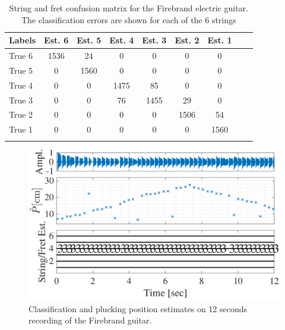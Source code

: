 \documentclass{article}
\begin{document}
%
\begin{table}\centering \vspace{-.6mm}
\caption{String and fret confusion matrix for the Firebrand electric guitar. The classification errors are shown for each of the 6 strings}
\label{tbl:str_confusion_firebrand}
\begin{tabularx}{0.46\textwidth}{@{}l*{7}{c}c@{}}
\toprule
Labels &Est. 6   &Est. 5 &Est. 4   &Est. 3   &Est. 2   &Est. 1   \\ 
\midrule
True 6   &1536 \cellcolor[gray]{.8}       & 24                        &0      &0  &0  &0 \\
True 5   &0  & 1560\cellcolor[gray]{.8}   & 0                        &0      &0  &0  \\
True 4   &0  &0  &1475 \cellcolor[gray]{.8}                           & 85   &0  &0  \\
True 3   &0  &0  &76                     &1455 \cellcolor[gray]{.8}   & 29   &0  \\
True 2   &0  &0  &0  &0                   &1506 \cellcolor[gray]{.8}  & 54  \\
True 1   &0  &0  &0  &0                   &0                          &1560 \cellcolor[gray]{.8} \\
\bottomrule \vspace{-6mm}
\end{tabularx}
\end{table}
%
\begin{figure}[t]
  \centering
  \centerline{\includegraphics[width=.9\columnwidth]{img/tablature_constant_note8}}\vspace{-2mm}
  \caption{Classification and plucking position estimates on 12 seconds recording of the Firebrand guitar.}\label{fig:pluck_position_fixed_tabs}
\vspace{-.6mm}
\end{figure}\vspace{-.6mm}
\end{document}
